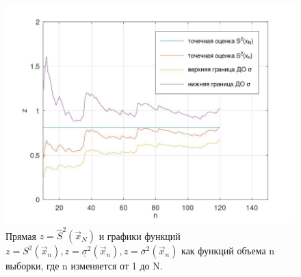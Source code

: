 \begin{figure}[ht!]
	\centering
	\includegraphics[scale=0.4]{assets/g-2.jpg}
	\caption{Прямая $z=\hat S^2 (\vec x_N)$ и графики функций $z= S^2 (\vec x_n), z= \underline \sigma^2 (\vec x_n), z =\overline \sigma^2 (\vec x_n)$ как функций объема n выборки, где n изменяется от 1 до N.}
\end{figure}
